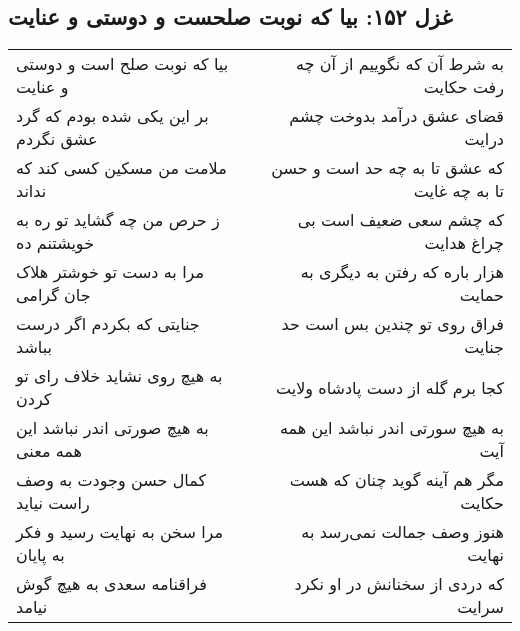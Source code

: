 \begin{center}
\section*{غزل ۱۵۲: بیا که نوبت صلحست و دوستی و عنایت}
\label{sec:152}
\begin{longtable}{l p{0.5cm} r}
بیا که نوبت صلح است و دوستی و عنایت
&&
به شرط آن که نگوییم از آن چه رفت حکایت
\\
بر این یکی شده بودم که گرد عشق نگردم
&&
قضای عشق درآمد بدوخت چشم درایت
\\
ملامت من مسکین کسی کند که نداند
&&
که عشق تا به چه حد است و حسن تا به چه غایت
\\
ز حرص من چه گشاید تو ره به خویشتنم ده
&&
که چشم سعی ضعیف است بی چراغ هدایت
\\
مرا به دست تو خوشتر هلاک جان گرامی
&&
هزار باره که رفتن به دیگری به حمایت
\\
جنایتی که بکردم اگر درست بباشد
&&
فراق روی تو چندین بس است حد جنایت
\\
به هیچ روی نشاید خلاف رای تو کردن
&&
کجا برم گله از دست پادشاه ولایت
\\
به هیچ صورتی اندر نباشد این همه معنی
&&
به هیچ سورتی اندر نباشد این همه آیت
\\
کمال حسن وجودت به وصف راست نیاید
&&
مگر هم آینه گوید چنان که هست حکایت
\\
مرا سخن به نهایت رسید و فکر به پایان
&&
هنوز وصف جمالت نمی‌رسد به نهایت
\\
فراقنامه سعدی به هیچ گوش نیامد
&&
که دردی از سخنانش در او نکرد سرایت
\\
\end{longtable}
\end{center}
